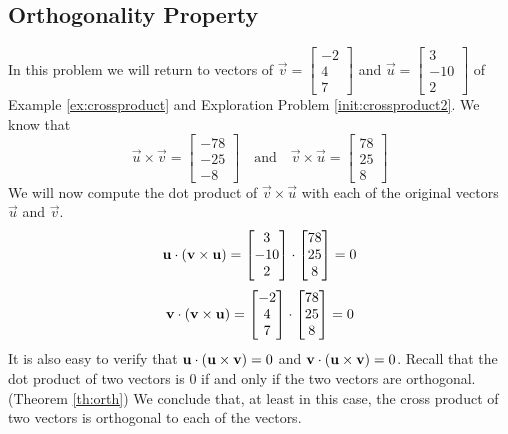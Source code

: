 \documentclass{ximera}
\begin{document}
\subsection*{Orthogonality Property}
\begin{initprob}\label{init:orthofcorssproduct}
In this problem we will return to vectors of $\vec{v}=\begin{bmatrix}-2\\ 4\\ 7\end{bmatrix}$ and $\vec{u}=\begin{bmatrix}3\\ -10\\ 2\end{bmatrix}$ of Example \ref{ex:crossproduct} and Exploration Problem \ref{init:crossproduct2}.  We know that 
$$\vec{u}\times\vec{v}=\begin{bmatrix}-78\\-25\\-8\end{bmatrix}\quad\text{and}\quad\vec{v}\times\vec{u}=\begin{bmatrix}78\\25\\8\end{bmatrix}$$
We will now compute the dot product of $\vec{v}\times\vec{u}$ with each of the original vectors $\vec{u}$ and $\vec{v}$.
$$\mathbf{u}\cdot(\mathbf{v}\times\mathbf{u})=\begin{bmatrix}3\\ -10\\ 2\end{bmatrix}\cdot\begin{bmatrix}78\\25\\8\end{bmatrix}=0$$
$$\mathbf{v}\cdot(\mathbf{v}\times\mathbf{u})=\begin{bmatrix}-2\\ 4\\ 7\end{bmatrix}\cdot\begin{bmatrix}78\\25\\8\end{bmatrix}=0$$
It is also easy to verify that $\mathbf{u}\cdot(\mathbf{u}\times\mathbf{v})=0$ and $\mathbf{v}\cdot(\mathbf{u}\times\mathbf{v})=0$.  Recall that the dot product of two vectors is $0$ if and only if the two vectors are orthogonal. (Theorem \ref{th:orth})
We conclude that, at least in this case, the cross product of two vectors is orthogonal to each of the vectors.  

\end{initprob}
\end{document}
